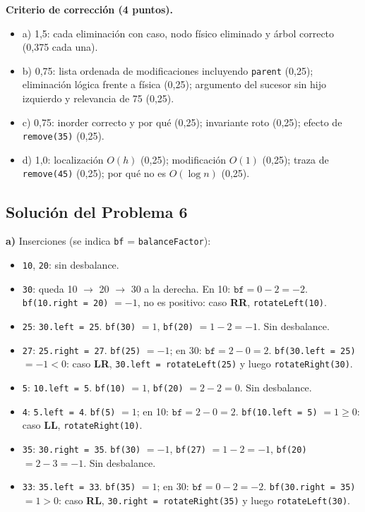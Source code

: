 \documentclass[11pt,a4paper]{article}
\begin{document}
\textbf{Criterio de corrección (4 puntos).}
\begin{itemize}[itemsep=0pt]
\item a) 1,5: cada eliminación con caso, nodo físico eliminado y árbol correcto (0,375 cada una).
\item b) 0,75: lista ordenada de modificaciones incluyendo \texttt{parent} (0,25); eliminación lógica frente a física (0,25); argumento del sucesor sin hijo izquierdo y relevancia de 75 (0,25).
\item c) 0,75: inorder correcto y por qué (0,25); invariante roto (0,25); efecto de \texttt{remove(35)} (0,25).
\item d) 1,0: localización $O(h)$ (0,25); modificación $O(1)$ (0,25); traza de \texttt{remove(45)} (0,25); por qué no es $O(\log n)$ (0,25).
\end{itemize}

\newpage
\subsection*{Solución del Problema 6}

\textbf{a)} Inserciones (se indica \texttt{bf} = \texttt{balanceFactor}):

\begin{itemize}[itemsep=1pt]
\item \texttt{10}, \texttt{20}: sin desbalance.
\item \texttt{30}: queda 10 $\to$ 20 $\to$ 30 a la derecha. En 10: $\texttt{bf} = 0 - 2 = -2$. \texttt{bf(10.right = 20)} $= -1$, no es positivo: caso \textbf{RR}, \texttt{rotateLeft(10)}.
\item \texttt{25}: \texttt{30.left = 25}. \texttt{bf(30)} $= 1$, \texttt{bf(20)} $= 1 - 2 = -1$. Sin desbalance.
\item \texttt{27}: \texttt{25.right = 27}. \texttt{bf(25)} $= -1$; en 30: $\texttt{bf} = 2 - 0 = 2$. \texttt{bf(30.left = 25)} $= -1 < 0$: caso \textbf{LR}, \texttt{30.left = rotateLeft(25)} y luego \texttt{rotateRight(30)}.
\item \texttt{5}: \texttt{10.left = 5}. \texttt{bf(10)} $= 1$, \texttt{bf(20)} $= 2 - 2 = 0$. Sin desbalance.
\item \texttt{4}: \texttt{5.left = 4}. \texttt{bf(5)} $= 1$; en 10: $\texttt{bf} = 2 - 0 = 2$. \texttt{bf(10.left = 5)} $= 1 \ge 0$: caso \textbf{LL}, \texttt{rotateRight(10)}.
\item \texttt{35}: \texttt{30.right = 35}. \texttt{bf(30)} $= -1$, \texttt{bf(27)} $= 1 - 2 = -1$, \texttt{bf(20)} $= 2 - 3 = -1$. Sin desbalance.
\item \texttt{33}: \texttt{35.left = 33}. \texttt{bf(35)} $= 1$; en 30: $\texttt{bf} = 0 - 2 = -2$. \texttt{bf(30.right = 35)} $= 1 > 0$: caso \textbf{RL}, \texttt{30.right = rotateRight(35)} y luego \texttt{rotateLeft(30)}.
\end{itemize}
\end{document}
